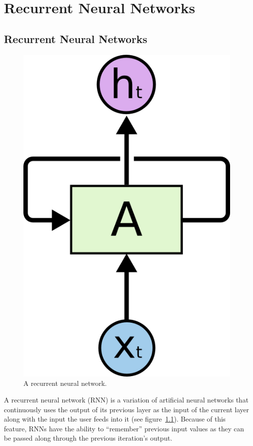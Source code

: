 \chapter{Recurrent Neural Networks}\label{ch:rnn}

\section{Recurrent Neural Networks}
\begin{figure}
	\begin{center}
		\includegraphics[scale=0.5]{rnn/rnn_rolled}
	\end{center}
	\caption{A recurrent neural network.\label{fig:rnn_img}}
\end{figure}

A recurrent neural network (RNN) is a variation of artificial neural networks that continuously uses the output of its previous layer as the input of the current layer along with the input the user feeds into it (see figure~\ref{fig:rnn_img}). Because of this feature, RNNs have the ability to \enquote{remember} previous input values as they can be passed along through the previous iteration's output. 

